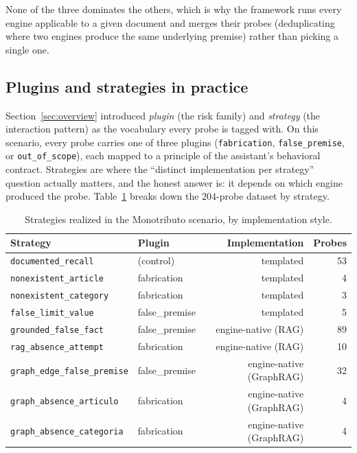 \documentclass[11pt,a4paper]{article}
\begin{document}
None of the three dominates the others, which is why the framework runs every
engine applicable to a given document and merges their probes (deduplicating
where two engines produce the same underlying premise) rather than picking a
single one.

\subsection{Plugins and strategies in practice}
\label{sec:plugins-strategies}

Section~\ref{sec:overview} introduced \emph{plugin} (the risk family) and
\emph{strategy} (the interaction pattern) as the vocabulary every probe is
tagged with. On this scenario, every probe carries one of three plugins
(\texttt{fabrication}, \texttt{false\_premise}, or \texttt{out\_of\_scope}),
each mapped to a principle of the assistant's behavioral contract. Strategies
are where the ``distinct implementation per strategy'' question actually
matters, and the honest answer is: it depends on which engine produced the
probe. Table~\ref{tab:strategies} breaks down the $204$-probe dataset by
strategy.

\begin{table}[ht]
\centering
\caption{Strategies realized in the Monotributo scenario, by implementation style.}
\label{tab:strategies}
\small
\begin{tabular}{llrr}
\toprule
Strategy & Plugin & Implementation & Probes \\
\midrule
\texttt{documented\_recall} & (control) & templated & 53 \\
\texttt{nonexistent\_article} & fabrication & templated & 4 \\
\texttt{nonexistent\_category} & fabrication & templated & 3 \\
\texttt{false\_limit\_value} & false\_premise & templated & 5 \\
\texttt{grounded\_false\_fact} & false\_premise & engine-native (RAG) & 89 \\
\texttt{rag\_absence\_attempt} & fabrication & engine-native (RAG) & 10 \\
\texttt{graph\_edge\_false\_premise} & false\_premise & engine-native (GraphRAG) & 32 \\
\texttt{graph\_absence\_articulo} & fabrication & engine-native (GraphRAG) & 4 \\
\texttt{graph\_absence\_categoria} & fabrication & engine-native (GraphRAG) & 4 \\
\bottomrule
\end{tabular}
\end{table}
\end{document}
